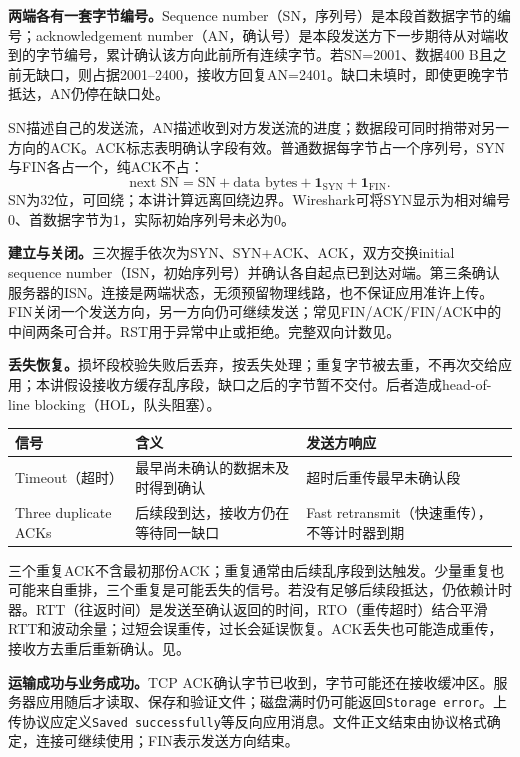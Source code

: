 \textbf{两端各有一套字节编号。}Sequence number（SN，序列号）是本段首数据字节的编号；acknowledgement number（AN，确认号）是本段发送方下一步期待从对端收到的字节编号，累计确认该方向此前所有连续字节。若SN=2001、数据400 B且之前无缺口，则占据2001--2400，接收方回复AN=2401。缺口未填时，即使更晚字节抵达，AN仍停在缺口处。

SN描述自己的发送流，AN描述收到对方发送流的进度；数据段可同时捎带对另一方向的ACK。ACK标志表明确认字段有效。普通数据每字节占一个序列号，SYN与FIN各占一个，纯ACK不占：
\[
 \boxed{\text{next SN}=\text{SN}+\text{data bytes}
       +\mathbf{1}_{\mathrm{SYN}}+\mathbf{1}_{\mathrm{FIN}}}.
\]
SN为32位，可回绕；本讲计算远离回绕边界。Wireshark可将SYN显示为相对编号0、首数据字节为1，实际初始序列号未必为0。

\textbf{建立与关闭。}三次握手依次为SYN、SYN+ACK、ACK，双方交换initial sequence number（ISN，初始序列号）并确认各自起点已到达对端。第三条确认服务器的ISN。连接是两端状态，无须预留物理线路，也不保证应用准许上传。FIN关闭一个发送方向，另一方向仍可继续发送；常见FIN/ACK/FIN/ACK中的中间两条可合并。RST用于异常中止或拒绝。完整双向计数见。

\textbf{丢失恢复。}损坏段校验失败后丢弃，按丢失处理；重复字节被去重，不再次交给应用；本讲假设接收方缓存乱序段，缺口之后的字节暂不交付。后者造成head-of-line blocking（HOL，队头阻塞）。

\begin{center}
\small
\begin{tabularx}{\textwidth}{@{}>{\raggedright\arraybackslash}p{2.8cm}XX@{}}
\toprule
信号 & 含义 & 发送方响应 \\
\midrule
Timeout（超时） & 最早尚未确认的数据未及时得到确认 & 超时后重传最早未确认段 \\
Three duplicate ACKs & 后续段到达，接收方仍在等待同一缺口 & Fast retransmit（快速重传），不等计时器到期 \\
\bottomrule
\end{tabularx}
\end{center}

三个重复ACK不含最初那份ACK；重复通常由后续乱序段到达触发。少量重复也可能来自重排，三个重复是可能丢失的信号。若没有足够后续段抵达，仍依赖计时器。RTT（往返时间）是发送至确认返回的时间，RTO（重传超时）结合平滑RTT和波动余量；过短会误重传，过长会延误恢复。ACK丢失也可能造成重传，接收方去重后重新确认。见。

\textbf{运输成功与业务成功。}TCP ACK确认字节已收到，字节可能还在接收缓冲区。服务器应用随后才读取、保存和验证文件；磁盘满时仍可能返回\texttt{Storage error}。上传协议应定义\texttt{Saved successfully}等反向应用消息。文件正文结束由协议格式确定，连接可继续使用；FIN表示发送方向结束。

